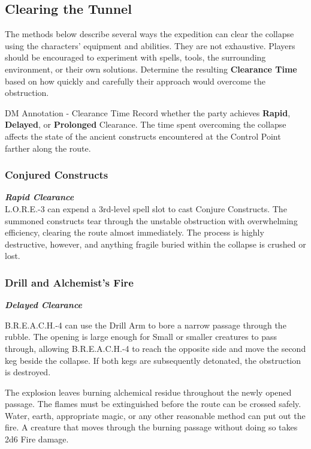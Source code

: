 \subsection*{Clearing the Tunnel}
{\entryfont The methods below describe several ways the expedition can clear the collapse using the characters' equipment and abilities. They are not exhaustive. Players should be encouraged to experiment with spells, tools, the surrounding environment, or their own solutions. Determine the resulting \textbf{Clearance Time} based on how quickly and carefully their approach would overcome the obstruction.}
\begingroup
	\DndSetThemeColor[PhbTan]
	\begin{DndComment}{DM Annotation - Clearance Time}
		Record whether the party achieves \textbf{Rapid}, \textbf{Delayed}, or \textbf{Prolonged} Clearance. The time spent overcoming the collapse affects the state of the ancient constructs encountered at the Control Point farther along the route.
	\end{DndComment}
\endgroup
\eject
\subsubsection*{Conjured Constructs}
\textbf{\textit{Rapid Clearance}}\\
{\entryfont L.O.R.E.-3 can expend a 3rd-level spell slot to cast Conjure Constructs. The summoned constructs tear through the unstable obstruction with overwhelming efficiency, clearing the route almost immediately. The process is highly destructive, however, and anything fragile buried within the collapse is crushed or lost.}
\subsubsection*{Drill and Alchemist's Fire}
\textbf{\textit{Delayed Clearance}}\\
{\entryfont B.R.E.A.C.H.-4 can use the Drill Arm to bore a narrow passage through the rubble. The opening is large enough for Small or smaller creatures to pass through, allowing B.R.E.A.C.H.-4 to reach the opposite side and move the second keg beside the collapse. If both kegs are subsequently detonated, the obstruction is destroyed.

The explosion leaves burning alchemical residue throughout the newly opened passage. The flames must be extinguished before the route can be crossed safely. Water, earth, appropriate magic, or any other reasonable method can put out the fire. A creature that moves through the burning passage without doing so takes 2d6 Fire damage.}
